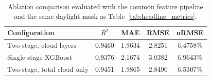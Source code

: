 \begin{table}[!t]
\caption{Ablation comparison evaluated with the common feature pipeline and the same daylight mask as Table~\ref{tab:headline_metrics}.}
\label{tab:ablation_summary}
\centering
\scriptsize
\begin{tabular}{@{}lcccc@{}}
\toprule
Configuration & $R^2$ & MAE & RMSE & nRMSE \\
\midrule
Two-stage, cloud layers & 0.9460 & 1.9634 & 2.8251 & 6.4758\% \\
Single-stage XGBoost & 0.9376 & 2.1674 & 3.0382 & 6.9643\% \\
Two-stage, total cloud only & 0.9451 & 1.9865 & 2.8490 & 6.5307\% \\
\bottomrule
\end{tabular}
\end{table}
